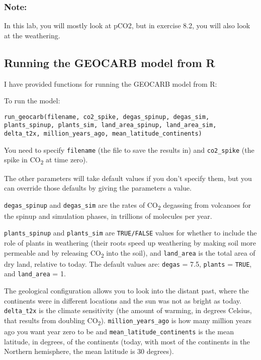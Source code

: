\documentclass[
]{article}
\begin{document}
\hypertarget{note}{%
\subsubsection{\texorpdfstring{\textbf{Note:}}{Note:}}\label{note}}

In this lab, you will mostly look at pCO2, but in exercise 8.2, you will
also look at the weathering.

\hypertarget{running-the-geocarb-model-from-r}{%
\subsection{Running the GEOCARB model from
R}\label{running-the-geocarb-model-from-r}}

I have provided functions for running the GEOCARB model from R:

To run the model:

\begin{verbatim}
run_geocarb(filename, co2_spike, degas_spinup, degas_sim,
plants_spinup, plants_sim, land_area_spinup, land_area_sim,
delta_t2x, million_years_ago, mean_latitude_continents)
\end{verbatim}

You need to specify \texttt{filename} (the file to save the results in)
and \texttt{co2\_spike} (the spike in CO\textsubscript{2} at time zero).

The other parameters will take default values if you don't specify them,
but you can override those defaults by giving the parameters a value.

\texttt{degas\_spinup} and \texttt{degas\_sim} are the rates of
CO\textsubscript{2} degassing from volcanoes for the spinup and
simulation phases, in trillions of molecules per year.

\texttt{plants\_spinup} and \texttt{plants\_sim} are \texttt{TRUE/FALSE}
values for whether to include the role of plants in weathering (their
roots speed up weathering by making soil more permeable and by releasing
CO\textsubscript{2} into the soil), and \texttt{land\_area} is the total
area of dry land, relative to today. The default values are:
\texttt{degas} = 7.5, \texttt{plants} = \texttt{TRUE}, and
\texttt{land\_area} = 1.

The geological configuration allows you to look into the distant past,
where the continents were in different locations and the sun was not as
bright as today.\\
\texttt{delta\_t2x} is the climate sensitivity (the amount of warming,
in degrees Celsius, that results from doubling CO\textsubscript{2}).
\texttt{million\_years\_ago} is how many million years ago you want year
zero to be and \texttt{mean\_latitude\_continents} is the mean latitude,
in degrees, of the continents (today, with most of the continents in the
Northern hemisphere, the mean latitude is 30 degrees).
\end{document}
